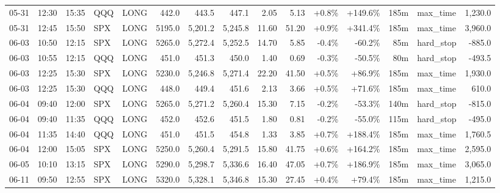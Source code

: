 \documentclass[11pt,a4paper,twoside]{article}
\begin{document}
\begin{landscape}
\begin{center}
\begin{longtable}{>{\color{txtmain}}l l l l l r r r r r r r r >{\color{txtmain}}l r}
05-31 & 12:30 & 15:35 & QQQ & LONG & 442.0 & 443.5 & 447.1 & 2.05 & 5.13 & \textcolor{wingreen}{+0.8\%} & \textcolor{wingreen}{+149.6\%} & 185m & max\_time & \textcolor{wingreen}{1,230.0} \\
05-31 & 12:45 & 15:50 & SPX & LONG & 5195.0 & 5,201.2 & 5,245.8 & 11.60 & 51.20 & \textcolor{wingreen}{+0.9\%} & \textcolor{wingreen}{+341.4\%} & 185m & max\_time & \textcolor{wingreen}{3,960.0} \\
06-03 & 10:50 & 12:15 & SPX & LONG & 5265.0 & 5,272.4 & 5,252.5 & 14.70 & 5.85 & \textcolor{lossred}{-0.4\%} & \textcolor{lossred}{-60.2\%} & 85m & hard\_stop & \textcolor{lossred}{-885.0} \\
06-03 & 10:55 & 12:15 & QQQ & LONG & 451.0 & 451.3 & 450.0 & 1.40 & 0.69 & \textcolor{lossred}{-0.3\%} & \textcolor{lossred}{-50.5\%} & 80m & hard\_stop & \textcolor{lossred}{-493.5} \\
06-03 & 12:25 & 15:30 & SPX & LONG & 5230.0 & 5,246.8 & 5,271.4 & 22.20 & 41.50 & \textcolor{wingreen}{+0.5\%} & \textcolor{wingreen}{+86.9\%} & 185m & max\_time & \textcolor{wingreen}{1,930.0} \\
06-03 & 12:25 & 15:30 & QQQ & LONG & 448.0 & 449.4 & 451.6 & 2.13 & 3.66 & \textcolor{wingreen}{+0.5\%} & \textcolor{wingreen}{+71.6\%} & 185m & max\_time & \textcolor{wingreen}{610.0} \\
06-04 & 09:40 & 12:00 & SPX & LONG & 5265.0 & 5,271.2 & 5,260.4 & 15.30 & 7.15 & \textcolor{lossred}{-0.2\%} & \textcolor{lossred}{-53.3\%} & 140m & hard\_stop & \textcolor{lossred}{-815.0} \\
06-04 & 09:40 & 11:35 & QQQ & LONG & 452.0 & 452.6 & 451.5 & 1.80 & 0.81 & \textcolor{lossred}{-0.2\%} & \textcolor{lossred}{-55.0\%} & 115m & hard\_stop & \textcolor{lossred}{-495.0} \\
06-04 & 11:35 & 14:40 & QQQ & LONG & 451.0 & 451.5 & 454.8 & 1.33 & 3.85 & \textcolor{wingreen}{+0.7\%} & \textcolor{wingreen}{+188.4\%} & 185m & max\_time & \textcolor{wingreen}{1,760.5} \\
06-04 & 12:00 & 15:05 & SPX & LONG & 5250.0 & 5,260.4 & 5,291.5 & 15.80 & 41.75 & \textcolor{wingreen}{+0.6\%} & \textcolor{wingreen}{+164.2\%} & 185m & max\_time & \textcolor{wingreen}{2,595.0} \\
06-05 & 10:10 & 13:15 & SPX & LONG & 5290.0 & 5,298.7 & 5,336.6 & 16.40 & 47.05 & \textcolor{wingreen}{+0.7\%} & \textcolor{wingreen}{+186.9\%} & 185m & max\_time & \textcolor{wingreen}{3,065.0} \\
06-11 & 09:50 & 12:55 & SPX & LONG & 5320.0 & 5,328.1 & 5,346.8 & 15.30 & 27.45 & \textcolor{wingreen}{+0.4\%} & \textcolor{wingreen}{+79.4\%} & 185m & max\_time & \textcolor{wingreen}{1,215.0} \\

\end{longtable}
\end{center}
\end{landscape}
\end{document}
